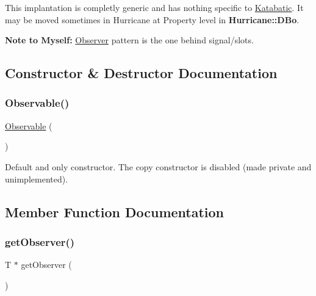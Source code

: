 This implantation is completly generic and has nothing specific to \mbox{\hyperlink{namespaceKatabatic}{Katabatic}}. It may be moved sometimes in Hurricane at Property level in \textbf{ Hurricane\+::\+D\+Bo}.

{\bfseries Note to Myself\+:} \mbox{\hyperlink{classKatabatic_1_1Observer}{Observer}} pattern is the one behind signal/slots. 

\subsection{Constructor \& Destructor Documentation}
\mbox{\label{classKatabatic_1_1Observable_a6438e92e07db169a97ed3eba36788dc4}} 
\subsubsection{\texorpdfstring{Observable()}{Observable()}}
{\footnotesize\ttfamily \mbox{\hyperlink{classKatabatic_1_1Observable}{Observable}} (\begin{DoxyParamCaption}{ }\end{DoxyParamCaption})\hspace{0.3cm}{\ttfamily [inline]}}

Default and only constructor. The copy constructor is disabled (made private and unimplemented). 

\subsection{Member Function Documentation}
\mbox{\label{classKatabatic_1_1Observable_acc0b7276e09628f2b101ecf751aacd2a}} 
\subsubsection{\texorpdfstring{get\+Observer()}{getObserver()}}
{\footnotesize\ttfamily T $\ast$ get\+Observer (\begin{DoxyParamCaption}{ }\end{DoxyParamCaption})\hspace{0.3cm}{\ttfamily [inline]}}

